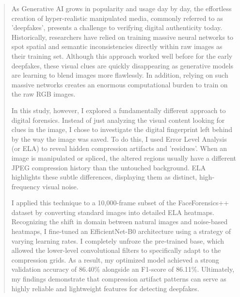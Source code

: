 \begin{abstract}
As Generative AI grows in popularity and usage day by
day, the effortless creation of hyper-realistic manipulated
media, commonly referred to as 'deepfakes', presents a challenge to verifying digital authenticity today. Historically, researchers have relied on training massive neural networks
to spot spatial and semantic inconsistencies directly within
raw images as their training set. Although this approach
worked well before for the early deepfakes, these visual
clues are quickly disappearing as generative models are
learning to blend images more flawlessly. In addition, relying on such massive networks creates an enormous computational burden to train on the raw RGB images.

In this study, however, I explored a fundamentally different approach to digital forensics. Instead of just analyzing the visual content looking for clues in the image, I chose to investigate the digital fingerprint left behind by the way the image was saved. To do this, I used Error Level Analysis (or ELA) to reveal hidden compression artifacts and 'residues'. When an image is manipulated or spliced, the altered regions usually have a different JPEG compression history than the untouched background. ELA highlights these subtle differences, displaying them as distinct, high-frequency visual noise.

I applied this technique to a 10,000-frame subset of
the FaceForensics++ dataset by converting standard images into detailed ELA heatmaps. Recognizing the shift in domain between natural images and noise-based heatmaps,
I fine-tuned an EfficientNet-B0 architecture using a strategy of varying learning rates. I completely unfroze the pre-trained base, which allowed the lower-level convolutional filters to specifically adapt to the compression grids. As a result, my optimized model achieved a strong validation accuracy of 86.40\% alongside an F1-score of 86.11\%. Ultimately, my findings demonstrate that compression artifact patterns can serve as highly reliable and lightweight features for detecting deepfakes.
\end{abstract}
